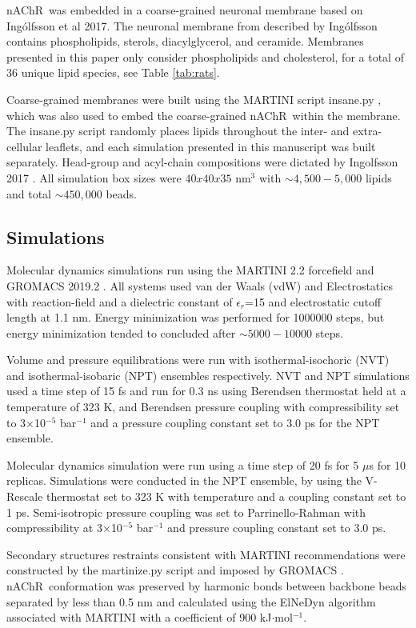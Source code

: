\documentclass[preprint,3p,9pt,times,onecolumn]{elsarticle}
\newcommand{\nachr}{nAChR}
\begin{document}
\nachr~was embedded in a coarse-grained neuronal membrane based on Ing{\'o}lfsson et al 2017. The neuronal membrane from described by Ing{\'o}lfsson contains phospholipids, sterols, diacylglycerol, and ceramide. Membranes presented in this paper only consider phospholipids and cholesterol, for a total of 36 unique lipid species, see Table \ref{tab:rats}.

Coarse-grained membranes were built using the MARTINI script insane.py \cite{Wassenaar2015}, which was also used to embed the coarse-grained \nachr~within the membrane. The insane.py script randomly places lipids throughout the inter- and extra-cellular leaflets, and each simulation presented in this manuscript was built separately. Head-group and  acyl-chain compositions were dictated by Ingolfsson 2017 \cite{Ingolfsson2017b}. All simulation box sizes were $40x40x35$ nm$^3$ with  $\sim 4,500-5,000$ lipids and total $\sim450,000$ beads.

\subsection{Simulations}

Molecular dynamics simulations run using the MARTINI 2.2\cite{DeJong2012} forcefield and GROMACS\cite{Berendsen1995,Abraham2015}  2019.2 . All systems used van der Waals (vdW) and Electrostatics with reaction-field and a dielectric constant of $\epsilon_r$=15 and electrostatic cutoff length at 1.1 nm. Energy minimization was performed for 1000000 steps, but energy minimization tended to concluded after $\sim 5000-10000$ steps.

Volume and pressure equilibrations were run with isothermal-isochoric (NVT) and isothermal-isobaric (NPT) ensembles respectively. NVT and NPT simulations used a time step of 15 fs and run for 0.3 ns using Berendsen thermostat held at a temperature of 323 K, and Berendsen pressure coupling with compressibility set to 3$\times$10$^{-5}$ bar$^{-1}$ and a pressure coupling constant set to 3.0 ps  for the NPT ensemble. 

Molecular dynamics simulation were run using a time step of 20 fs for 5 $\mu$s for 10 replicas. Simulations were conducted in the NPT ensemble, by using the V-Rescale thermostat set to 323 K with temperature and a coupling constant set to 1 ps. Semi-isotropic pressure coupling was set to Parrinello-Rahman with compressibility at 3$\times$10$^{-5}$ bar$^{-1}$ and pressure coupling constant set to 3.0 ps. 

Secondary structures restraints consistent with MARTINI recommendations were constructed by the martinize.py \cite{DeJong2012,} script and imposed by GROMACS \cite{Berendsen1995,Abraham2015}. \nachr~conformation was preserved by harmonic bonds between backbone beads separated by less than 0.5 nm and calculated using the ElNeDyn algorithm \cite{Periole2009} associated with MARTINI \cite{DeJong2012} with a coefficient of 900 kJ$\cdot$mol$^{-1}$.
\end{document}
